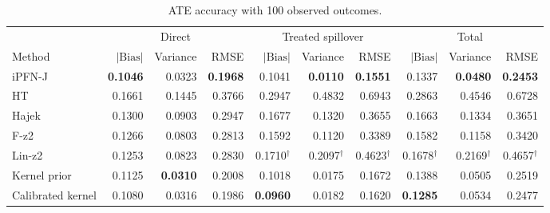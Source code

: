\begin{table}[tb]
\centering
\caption{ATE accuracy with 100 observed outcomes.}
\begingroup\footnotesize
\setlength{\tabcolsep}{3pt}
\begin{tabular*}{\linewidth}{@{\extracolsep{\fill}}l*{9}{r}@{}}
\toprule
&\multicolumn{3}{c}{Direct}&\multicolumn{3}{c}{Treated spillover}&\multicolumn{3}{c}{Total}\\
\cmidrule(lr){2-4}\cmidrule(lr){5-7}\cmidrule(lr){8-10}
Method&$|\mathrm{Bias}|$&Variance&RMSE&$|\mathrm{Bias}|$&Variance&RMSE&$|\mathrm{Bias}|$&Variance&RMSE\\
\midrule
iPFN-J & \cellcolor{blue!24}\textbf{0.1046} & \cellcolor{blue!11}0.0323 & \cellcolor{blue!24}\textbf{0.1968} & \cellcolor{blue!11}0.1041 & \cellcolor{blue!24}\textbf{0.0110} & \cellcolor{blue!24}\textbf{0.1551} & \cellcolor{blue!17}0.1337 & \cellcolor{blue!24}\textbf{0.0480} & \cellcolor{blue!24}\textbf{0.2453} \\
HT & \cellcolor{blue!1}0.1661 & \cellcolor{blue!1}0.1445 & \cellcolor{blue!1}0.3766 & \cellcolor{blue!1}0.2947 & \cellcolor{blue!1}0.4832 & \cellcolor{blue!1}0.6943 & \cellcolor{blue!1}0.2863 & \cellcolor{blue!1}0.4546 & \cellcolor{blue!1}0.6728 \\
Hajek & \cellcolor{blue!1}0.1300 & \cellcolor{blue!1}0.0903 & \cellcolor{blue!1}0.2947 & \cellcolor{blue!2}0.1677 & \cellcolor{blue!2}0.1320 & \cellcolor{blue!2}0.3655 & \cellcolor{blue!2}0.1663 & \cellcolor{blue!2}0.1334 & \cellcolor{blue!2}0.3651 \\
F-z2 & \cellcolor{blue!2}0.1266 & \cellcolor{blue!4}0.0803 & \cellcolor{blue!4}0.2813 & \cellcolor{blue!4}0.1592 & \cellcolor{blue!4}0.1120 & \cellcolor{blue!4}0.3389 & \cellcolor{blue!4}0.1582 & \cellcolor{blue!4}0.1158 & \cellcolor{blue!4}0.3420 \\
Lin-z2 & \cellcolor{blue!4}0.1253 & \cellcolor{blue!2}0.0823 & \cellcolor{blue!2}0.2830 & 0.1710$^{\dagger}$ & 0.2097$^{\dagger}$ & 0.4623$^{\dagger}$ & 0.1678$^{\dagger}$ & 0.2169$^{\dagger}$ & 0.4657$^{\dagger}$ \\
Kernel prior & \cellcolor{blue!7}0.1125 & \cellcolor{blue!24}\textbf{0.0310} & \cellcolor{blue!7}0.2008 & \cellcolor{blue!17}0.1018 & \cellcolor{blue!11}0.0175 & \cellcolor{blue!7}0.1672 & \cellcolor{blue!7}0.1388 & \cellcolor{blue!11}0.0505 & \cellcolor{blue!7}0.2519 \\
Calibrated kernel & \cellcolor{blue!11}0.1080 & \cellcolor{blue!17}0.0316 & \cellcolor{blue!11}0.1986 & \cellcolor{blue!24}\textbf{0.0960} & \cellcolor{blue!7}0.0182 & \cellcolor{blue!11}0.1620 & \cellcolor{blue!24}\textbf{0.1285} & \cellcolor{blue!7}0.0534 & \cellcolor{blue!11}0.2477 \\

\end{tabular*}
\end{table}
